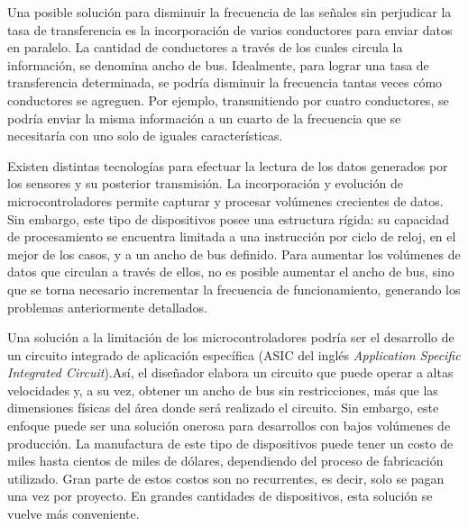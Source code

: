 Una posible solución para disminuir la frecuencia de las señales sin perjudicar la tasa de transferencia es la incorporación de varios conductores para enviar datos en paralelo.
La cantidad de conductores a través de los cuales circula la información, se denomina ancho de bus. Idealmente, para lograr una tasa de transferencia determinada, se podría disminuir la frecuencia tantas veces cómo conductores se agreguen. Por ejemplo, transmitiendo por cuatro conductores, se podría enviar la misma información a un cuarto de la frecuencia que se necesitaría con uno solo de iguales características.%

Existen distintas tecnologías para efectuar la lectura de los datos generados por los sensores y su posterior transmisión. La incorporación y evolución de microcontroladores permite capturar y procesar volúmenes crecientes de datos. Sin embargo, este tipo de dispositivos posee una estructura rígida: su capacidad de procesamiento se encuentra limitada a una instrucción por ciclo de reloj, en el mejor de los casos, y a un ancho de bus definido. Para aumentar los volúmenes de datos que circulan a través de ellos, no es posible aumentar el ancho de bus, sino que se torna necesario incrementar la frecuencia de funcionamiento, generando los problemas anteriormente detallados.%

Una solución a la limitación de los microcontroladores podría ser
el desarrollo de un circuito integrado de aplicación específica (ASIC del inglés {\it Application Specific Integrated Circuit}).Así, el diseñador elabora un circuito que puede operar a altas velocidades y, a su vez, obtener un ancho de bus sin restricciones, más que las dimensiones físicas del área donde será realizado el circuito. Sin embargo, este enfoque puede ser una solución onerosa para desarrollos con bajos volúmenes de producción. La manufactura de este tipo de dispositivos puede tener un costo de miles hasta cientos de miles de dólares, dependiendo del proceso de fabricación utilizado. Gran parte de estos costos son no recurrentes, es decir, solo se pagan una vez por proyecto. En grandes cantidades de dispositivos, esta solución se vuelve más conveniente.%

